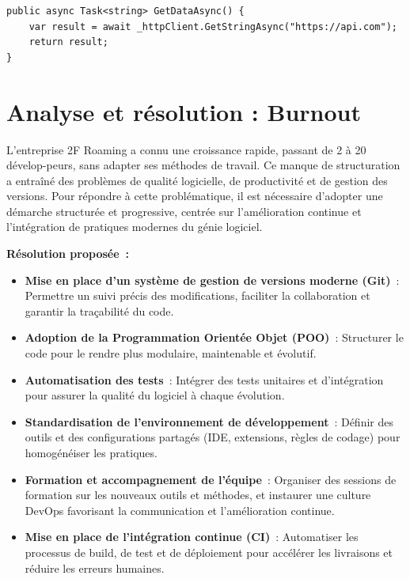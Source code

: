 \begin{verbatim}
public async Task<string> GetDataAsync() {
    var result = await _httpClient.GetStringAsync("https://api.com");
    return result;
}
\end{verbatim}

\newpage

\section*{Analyse et résolution : Burnout}

L'entreprise 2F Roaming a connu une croissance rapide, passant de 2 à 20 dévelop-peurs, sans adapter ses méthodes de travail. Ce manque de structuration a entraîné des problèmes de qualité logicielle, de productivité et de gestion des versions. Pour répondre à cette problématique, il est nécessaire d'adopter une démarche structurée et progressive, centrée sur l'amélioration continue et l'intégration de pratiques modernes du génie logiciel.

\noindent \textbf{Résolution proposée~:}

\begin{itemize}
	\item \textbf{Mise en place d'un système de gestion de versions moderne (Git)}~: Permettre un suivi précis des modifications, faciliter la collaboration et garantir la traçabilité du code.
	\item \textbf{Adoption de la Programmation Orientée Objet (POO)}~: Structurer le code pour le rendre plus modulaire, maintenable et évolutif.
	\item \textbf{Automatisation des tests}~: Intégrer des tests unitaires et d'intégration pour assurer la qualité du logiciel à chaque évolution.
	\item \textbf{Standardisation de l'environnement de développement}~: Définir des outils et des configurations partagés (IDE, extensions, règles de codage) pour homogénéiser les pratiques.
	\item \textbf{Formation et accompagnement de l'équipe}~: Organiser des sessions de formation sur les nouveaux outils et méthodes, et instaurer une culture DevOps favorisant la communication et l'amélioration continue.
	\item \textbf{Mise en place de l'intégration continue (CI)}~: Automatiser les processus de build, de test et de déploiement pour accélérer les livraisons et réduire les erreurs humaines.
\end{itemize}

